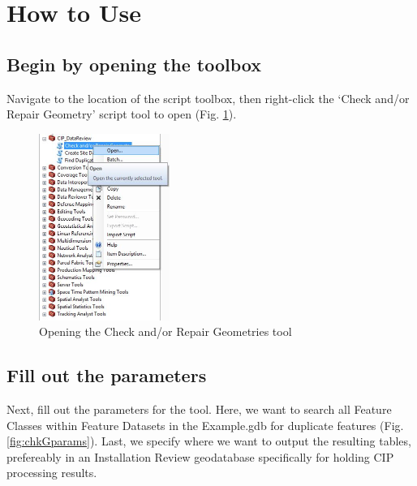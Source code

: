 \documentclass[openany]{book}
\theoremstyle{definition}
\theoremstyle{definition}
\theoremstyle{definition}
\theoremstyle{remark}
\begin{document}
\section{How to Use}\label{how-to-use-5}

\subsection{Begin by opening the
toolbox}\label{begin-by-opening-the-toolbox-5}

Navigate to the location of the script toolbox, then right-click the
`Check and/or Repair Geometry' script tool to open (Fig.
\ref{fig:chkGopen}).

\begin{figure}[H]

{\centering \includegraphics[width=1.68in,]{figures/chkG-open} 

}

\caption{Opening the Check and/or Repair Geometries tool}\label{fig:chkGopen}
\end{figure}

\subsection{Fill out the parameters}\label{fill-out-the-parameters-5}

Next, fill out the parameters for the tool. Here, we want to search all
Feature Classes within Feature Datasets in the Example.gdb for duplicate
features (Fig. \ref{fig:chkGparams}). Last, we specify where we want to
output the resulting tables, prefereably in an Installation Review
geodatabase specifically for holding CIP processing results.\\
\end{document}
